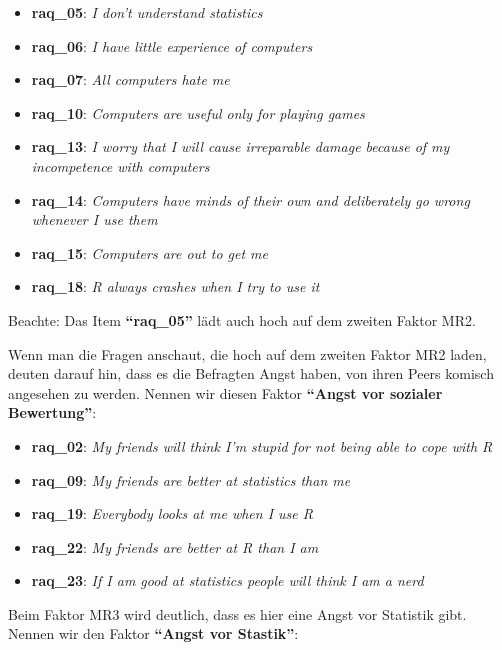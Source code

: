 \documentclass[
  10pt,
  letterpaper,
  a4paper, twoside]{scrreprt}
\providecommand{\tightlist}{%
  \setlength{\itemsep}{0pt}\setlength{\parskip}{0pt}}\usepackage{longtable,booktabs,array}
\begin{document}
\begin{itemize}
\tightlist
\item
  \textbf{raq\_05}: \emph{I don't understand statistics}
\item
  \textbf{raq\_06}: \emph{I have little experience of computers}
\item
  \textbf{raq\_07}: \emph{All computers hate me}
\item
  \textbf{raq\_10}: \emph{Computers are useful only for playing games}
\item
  \textbf{raq\_13}: \emph{I worry that I will cause irreparable damage
  because of my incompetence with computers}
\item
  \textbf{raq\_14}: \emph{Computers have minds of their own and
  deliberately go wrong whenever I use them}
\item
  \textbf{raq\_15}: \emph{Computers are out to get me}
\item
  \textbf{raq\_18}: \emph{R always crashes when I try to use it}
\end{itemize}

Beachte: Das Item \textbf{\enquote{raq\_05}} lädt auch hoch auf dem
zweiten Faktor MR2.

Wenn man die Fragen anschaut, die hoch auf dem zweiten Faktor MR2 laden,
deuten darauf hin, dass es die Befragten Angst haben, von ihren Peers
komisch angesehen zu werden. Nennen wir diesen Faktor
\textbf{\enquote{Angst vor sozialer Bewertung}}:

\begin{itemize}
\tightlist
\item
  \textbf{raq\_02}: \emph{My friends will think I'm stupid for not being
  able to cope with R}
\item
  \textbf{raq\_09}: \emph{My friends are better at statistics than me}
\item
  \textbf{raq\_19}: \emph{Everybody looks at me when I use R}
\item
  \textbf{raq\_22}: \emph{My friends are better at R than I am}
\item
  \textbf{raq\_23}: \emph{If I am good at statistics people will think I
  am a nerd}
\end{itemize}

Beim Faktor MR3 wird deutlich, dass es hier eine Angst vor Statistik
gibt. Nennen wir den Faktor \textbf{\enquote{Angst vor Stastik}}:
\end{document}
